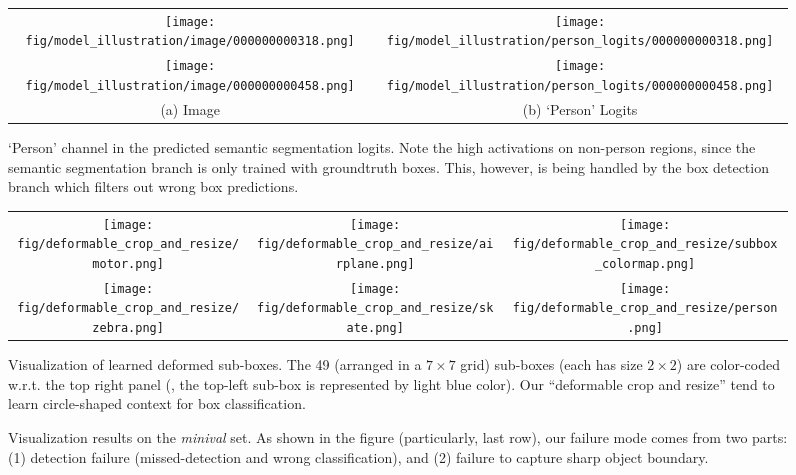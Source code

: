 \begin{figure}[!t]
  \centering
  \begin{tabular}{c c}
    \texttt{[image: fig/model\_illustration/image/000000000318.png]} &
    \texttt{[image: fig/model\_illustration/person\_logits/000000000318.png]} \\
    \texttt{[image: fig/model\_illustration/image/000000000458.png]} &
    \texttt{[image: fig/model\_illustration/person\_logits/000000000458.png]} \\
    (a) Image &
    (b) `Person' Logits\\
  \end{tabular}
  \caption{`Person' channel in the predicted semantic segmentation logits. Note the high activations on non-person regions, since the semantic segmentation branch is only trained with groundtruth boxes. This, however, is being handled by the box detection branch which filters out wrong box predictions.}
  \label{fig:sem_seg_logits}
\end{figure}

\begin{figure}[!t]
  \centering
  \begin{tabular}{c c c}
    \texttt{[image: fig/deformable\_crop\_and\_resize/motor.png]} &
    \texttt{[image: fig/deformable\_crop\_and\_resize/airplane.png]} &
    \multicolumn{1}{|c}{
    \texttt{[image: fig/deformable\_crop\_and\_resize/subbox\_colormap.png]}} \\
    \texttt{[image: fig/deformable\_crop\_and\_resize/zebra.png]} &
    \texttt{[image: fig/deformable\_crop\_and\_resize/skate.png]} &
    \texttt{[image: fig/deformable\_crop\_and\_resize/person.png]} \\
  \end{tabular}
  \caption{Visualization of learned deformed sub-boxes. The 49 (arranged in a $7\times7$ grid) sub-boxes (each has size $2\times2$) are color-coded w.r.t. the top right panel (\eg, the top-left sub-box is represented by light blue color). Our ``deformable crop and resize'' tend to learn circle-shaped context for box classification.}
  \label{fig:vis_deformed_crop_and_resize}
\end{figure}

\begin{figure*}[!t]
  \centering
  \caption{Visualization results on the \textit{minival} set. As shown in the figure (particularly, last row), our failure mode comes from two parts: (1) detection failure (missed-detection and wrong classification), and (2) failure to capture sharp object boundary.}
  \label{fig:vis_val}
\end{figure*}
